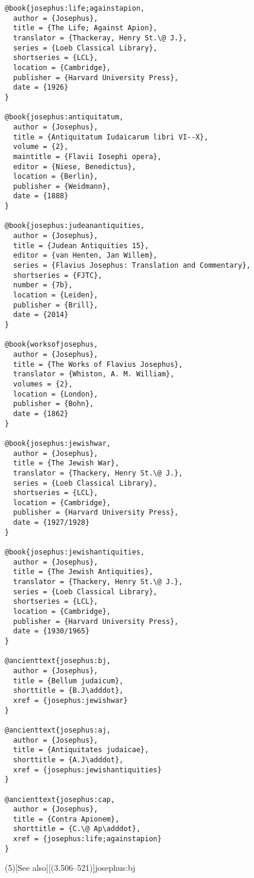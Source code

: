 \documentclass[a4paper]{article}
\renewcommand\footnote[1]{##1}%
\begin{document}
\begin{verbatim}
@book{josephus:life;againstapion,
  author = {Josephus},
  title = {The Life; Against Apion},
  translator = {Thackeray, Henry St.\@ J.},
  series = {Loeb Classical Library},
  shortseries = {LCL},
  location = {Cambridge},
  publisher = {Harvard University Press},
  date = {1926}
}

@book{josephus:antiquitatum,
  author = {Josephus},
  title = {Antiquitatum Iudaicarum libri VI--X},
  volume = {2},
  maintitle = {Flavii Iosephi opera},
  editor = {Niese, Benedictus},
  location = {Berlin},
  publisher = {Weidmann},
  date = {1888}
}

@book{josephus:judeanantiquities,
  author = {Josephus},
  title = {Judean Antiquities 15},
  editor = {van Henten, Jan Willem},
  series = {Flavius Josephus: Translation and Commentary},
  shortseries = {FJTC},
  number = {7b},
  location = {Leiden},
  publisher = {Brill},
  date = {2014}
}

@book{worksofjosephus,
  author = {Josephus},
  title = {The Works of Flavius Josephus},
  translator = {Whiston, A. M. William},
  volumes = {2},
  location = {London},
  publisher = {Bohn},
  date = {1862}
}

@book{josephus:jewishwar,
  author = {Josephus},
  title = {The Jewish War},
  translator = {Thackery, Henry St.\@ J.},
  series = {Loeb Classical Library},
  shortseries = {LCL},
  location = {Cambridge},
  publisher = {Harvard University Press},
  date = {1927/1928}
}

@book{josephus:jewishantiquities,
  author = {Josephus},
  title = {The Jewish Antiquities},
  translator = {Thackery, Henry St.\@ J.},
  series = {Loeb Classical Library},
  shortseries = {LCL},
  location = {Cambridge},
  publisher = {Harvard University Press},
  date = {1930/1965}
}

@ancienttext{josephus:bj,
  author = {Josephus},
  title = {Bellum judaicum},
  shorttitle = {B.J\adddot},
  xref = {josephus:jewishwar}
}

@ancienttext{josephus:aj,
  author = {Josephus},
  title = {Antiquitates judaicae},
  shorttitle = {A.J\adddot},
  xref = {josephus:jewishantiquities}
}

@ancienttext{josephus:cap,
  author = {Josephus},
  title = {Contra Apionem},
  shorttitle = {C.\@ Ap\adddot},
  xref = {josephus:life;againstapion}
}
\end{verbatim}

\examplecite[atrans](5)[See also][(3.506–521)]{josephus:bj}
\begin{verbcite}
  \nocite{josephus:antiquitatum, josephus:judeanantiquities, worksofjosephus}
\end{verbcite}
\exampleancientsources
\examplesecondarysources
\examplebibliography
\end{document}
